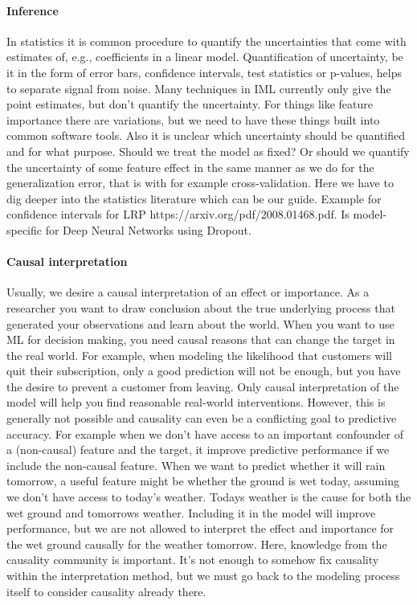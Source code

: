 \documentclass[runningheads]{llncs}
\begin{document}
\paragraph{Inference}
In statistics it is common procedure to quantify the uncertainties that come with estimates of, e.g., coefficients in a linear model.
Quantification of uncertainty, be it in the form of error bars, confidence intervals, test statistics or p-values, helps to separate signal from noise.
Many techniques in IML currently only give the point estimates, but don't quantify the uncertainty.
For things like feature importance there are variations, but we need to have these things built into common software tools.
Also it is unclear which uncertainty should be quantified and for what purpose.
Should we treat the model as fixed?
Or should we quantify the uncertainty of some feature effect in the same manner as we do for the generalization error, that is with for example cross-validation.
Here we have to dig deeper into the statistics literature which can be our guide.
Example for confidence intervals for LRP https://arxiv.org/pdf/2008.01468.pdf.
Is model-specific for Deep Neural Networks using Dropout.



\paragraph{Causal interpretation}
Usually, we desire a causal interpretation of an effect or importance.
As a researcher you want to draw conclusion about the true underlying process that generated your observations and learn about the world.
When you want to use ML for decision making, you need causal reasons that can change the target in the real world.
For example, when modeling the likelihood that customers will quit their subscription, only a good prediction will not be enough, but you have the desire to prevent a customer from leaving.
Only causal interpretation of the model will help you find reasonable real-world interventions.
However, this is generally not possible and causality can even be a conflicting goal to predictive accuracy.
For example when we don't have access to an important confounder of a (non-causal) feature and the target, it improve predictive performance if we include the non-causal feature.
When we want to predict whether it will rain tomorrow, a useful feature might be whether the ground is wet today, assuming we don't have access to today's weather.
Todays weather is the cause for both the wet ground and tomorrows weather.
Including it in the model will improve performance, but we are not allowed to interpret the effect and importance for the wet ground causally for the weather tomorrow.
Here, knowledge from the causality community is important.
It's not enough to somehow fix causality within the interpretation method, but we must go back to the modeling process itself to consider causality already there.
\end{document}
